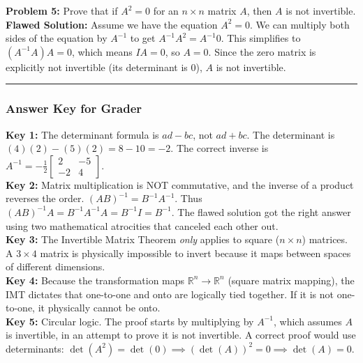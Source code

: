 \documentclass[11pt]{article}
\begin{document}
\vspace{0.5cm}
\textbf{Problem 5:} Prove that if $A^2 = 0$ for an $n \times n$ matrix $A$, then $A$ is not invertible.
\newline
\textbf{Flawed Solution:} 
Assume we have the equation $A^2 = 0$. We can multiply both sides of the equation by $A^{-1}$ to get $A^{-1} A^2 = A^{-1} 0$.
This simplifies to $(A^{-1} A) A = 0$, which means $I A = 0$, so $A = 0$.
Since the zero matrix is explicitly not invertible (its determinant is 0), $A$ is not invertible.

\vspace{1cm}
\hrule
\vspace{0.5cm}
\subsubsection*{Answer Key for Grader}
\textbf{Key 1:} The determinant formula is $ad-bc$, not $ad+bc$. The determinant is $(4)(2) - (5)(2) = 8 - 10 = -2$. The correct inverse is $A^{-1} = -\frac{1}{2}\begin{bmatrix} 2 & -5 \\ -2 & 4 \end{bmatrix}$. \\
\textbf{Key 2:} Matrix multiplication is NOT commutative, and the inverse of a product reverses the order. $(AB)^{-1} = B^{-1}A^{-1}$. Thus $(AB)^{-1} A = B^{-1}A^{-1}A = B^{-1}I = B^{-1}$. The flawed solution got the right answer using two mathematical atrocities that canceled each other out. \\
\textbf{Key 3:} The Invertible Matrix Theorem \textit{only} applies to square ($n \times n$) matrices. A $3 \times 4$ matrix is physically impossible to invert because it maps between spaces of different dimensions. \\
\textbf{Key 4:} Because the transformation maps $\mathbb{R}^n \to \mathbb{R}^n$ (square matrix mapping), the IMT dictates that one-to-one and onto are logically tied together. If it is not one-to-one, it physically cannot be onto. \\
\textbf{Key 5:} Circular logic. The proof starts by multiplying by $A^{-1}$, which assumes $A$ is invertible, in an attempt to prove it is not invertible. A correct proof would use determinants: $\det(A^2) = \det(0) \implies (\det(A))^2 = 0 \implies \det(A) = 0$.
\end{document}
